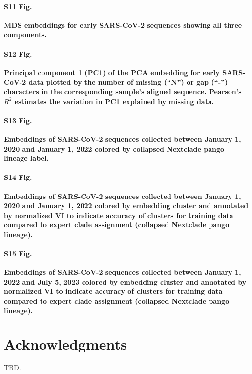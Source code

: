 \documentclass[10pt,letterpaper]{article}
\begin{document}
\paragraph*{S11 Fig.}
\label{S11_Fig_sarscov2_early_mds}
{\bf MDS embeddings for early SARS-CoV-2 sequences showing all three components.}

\paragraph*{S12 Fig.}
\label{S12_Fig_sarscov2_early_pc1_vs_bases_missing}
{\bf Principal component 1 (PC1) of the PCA embedding for early SARS-CoV-2 data plotted by the number of missing (``N'') or gap (``-'') characters in the corresponding sample's aligned sequence. Pearson's $R^{2}$ estimates the variation in PC1 explained by missing data.}

\paragraph*{S13 Fig.}
\label{S13_Fig_sarscov2_early_embeddings_by_Nextclade_pango}
{\bf Embeddings of SARS-CoV-2 sequences collected between January 1, 2020 and January 1, 2022 colored by collapsed Nextclade pango lineage label.}

\paragraph*{S14 Fig.}
\label{S14_Fig_sarscov2_early_embeddings_by_cluster_vs_Nextclade_pango}
{\bf Embeddings of SARS-CoV-2 sequences collected between January 1, 2020 and January 1, 2022 colored by embedding cluster and annotated by normalized VI to indicate accuracy of clusters for training data compared to expert clade assignment (collapsed Nextclade pango lineage).}

\paragraph*{S15 Fig.}
\label{S15_Fig_sarscov2_late_embeddings_by_cluster_vs_Nextclade_pango}
{\bf Embeddings of SARS-CoV-2 sequences collected between January 1, 2022 and July 5, 2023 colored by embedding cluster and annotated by normalized VI to indicate accuracy of clusters for training data compared to expert clade assignment (collapsed Nextclade pango lineage).}

\section*{Acknowledgments}
TBD.
\end{document}
